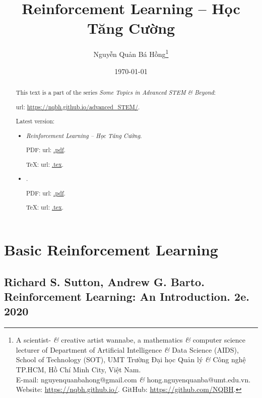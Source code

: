 \documentclass{article}
\title{Reinforcement Learning -- Học Tăng Cường}
\author{Nguyễn Quản Bá Hồng\footnote{A scientist- {\it\&} creative artist wannabe, a mathematics {\it\&} computer science lecturer of Department of Artificial Intelligence {\it\&} Data Science (AIDS), School of Technology (SOT), UMT Trường Đại học Quản lý {\it\&} Công nghệ TP.HCM, Hồ Chí Minh City, Việt Nam.\\E-mail: {\sf nguyenquanbahong@gmail.com} {\it\&} {\sf hong.nguyenquanba@umt.edu.vn}. Website: \url{https://nqbh.github.io/}. GitHub: \url{https://github.com/NQBH}.}}
\date{\today}
\begin{document}
\maketitle
\begin{abstract}
    This text is a part of the series {\it Some Topics in Advanced STEM \& Beyond}:

    {\sc url}: \url{https://nqbh.github.io/advanced_STEM/}.

    Latest version:
    \begin{itemize}
        \item {\it Reinforcement Learning -- Học Tăng Cường}.

        PDF: {\sc url}: \url{.pdf}.

        \TeX: {\sc url}: \url{.tex}.
        \item {\it }.

        PDF: {\sc url}: \url{.pdf}.

        \TeX: {\sc url}: \url{.tex}.
    \end{itemize}
\end{abstract}
\tableofcontents


\section{Basic Reinforcement Learning}


\subsection{{\sc Richard S. Sutton, Andrew G. Barto}. Reinforcement Learning: An Introduction. 2e. 2020}
\end{document}
